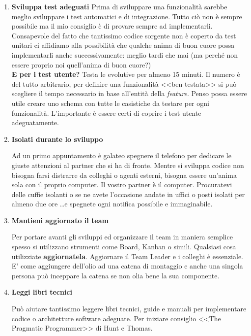 \begin{enumerate}
\item \textbf{Sviluppa test adeguati}
Prima di sviluppare una funzionalità sarebbe meglio sviluppare i test automatici e di integrazione. Tutto ciò non è sempre possibile ma il mio consiglio è di provare sempre ad implementarli. Consapevole del fatto che tantissimo codice sorgente non è coperto da test unitari ci affidiamo alla possibilità che qualche anima di buon cuore possa implementarli anche successivamente: meglio tardi che mai (ma perché non essere proprio noi quell'anima di buon cuore?) 
\\
\textbf{E per i test utente?} Testa le evolutive per almeno 15 minuti.
Il numero è del tutto arbitrario, per definire una funzionalità <<ben testata>> si può scegliere il tempo necessario in base all'entità della \emph{feature}. Penso possa essere utile creare uno schema con tutte le casistiche da testare per ogni funzionalità. L'importante è essere certi di coprire i test utente adeguatamente.

\item \textbf{Isolati durante lo sviluppo}

Ad un primo appuntamento è galateo spegnere il telefono per dedicare le giuste attenzioni al partner che si ha di fronte. Mentre si sviluppa codice non bisogna farsi distrarre da colleghi o agenti esterni, bisogna essere un'anima sola con il proprio computer. Il vostro partner è il computer. Procuratevi delle cuffie isolanti o se ne avete l'occasione andate in uffici o posti isolati per almeno due ore \dots e spegnete ogni notifica possibile e immaginabile.

\item \textbf{Mantieni aggiornato il team}

Per portare avanti gli sviluppi ed organizzare il team in maniera semplice spesso si utilizzano strumenti come Board, Kanban o simili. Qualsiasi cosa utilizziate \textbf{aggiornatela}. Aggiornare il Team Leader e i colleghi è essenziale. E' come aggiungere dell'olio ad una catena di montaggio e anche una singola persona può inceppare la catena se non olia bene la sua componente.

\item \textbf{Leggi libri tecnici}

Può aiutare tantissimo leggere libri tecnici, guide e manuali per implementare codice o architetture software adeguate. Per iniziare consiglio <<The Pragmatic Programmer>> di Hunt e Thomas.

\end{enumerate}

